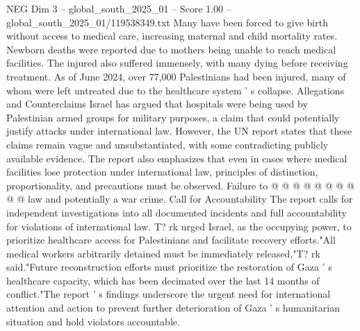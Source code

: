 \begin{textsample}{NEG Dim 3 – global\_south\_2025\_01 – Score 1.00 – global\_south\_2025\_01/119538349.txt}
Many have been forced to give birth without access to medical care, increasing maternal and child mortality rates.
Newborn deaths were reported due to mothers being unable to reach medical facilities.
The injured also suffered immensely, with many dying before receiving treatment.
As of June 2024, over 77,000 Palestinians had been injured, many of whom were left untreated due to the healthcare system ' s collapse.
Allegations and Counterclaims Israel has argued that hospitals were being used by Palestinian armed groups for military purposes, a claim that could potentially justify attacks under international law.
However, the UN report states that these claims remain vague and unsubstantiated, with some contradicting publicly available evidence.
The report also emphasizes that even in cases where medical facilities lose protection under international law, principles of distinction, proportionality, and precautions must be observed.
Failure to @ @ @ @ @ @ @ @ @ @ law and potentially a war crime.
Call for Accountability The report calls for independent investigations into all documented incidents and full accountability for violations of international law.
T? rk urged Israel, as the occupying power, to prioritize healthcare access for Palestinians and facilitate recovery efforts."All medical workers arbitrarily detained must be immediately released,"T? rk said."Future reconstruction efforts must prioritize the restoration of Gaza ' s healthcare capacity, which has been decimated over the last 14 months of conflict."The report ' s findings underscore the urgent need for international attention and action to prevent further deterioration of Gaza ' s humanitarian situation and hold violators accountable.

\end{textsample}
